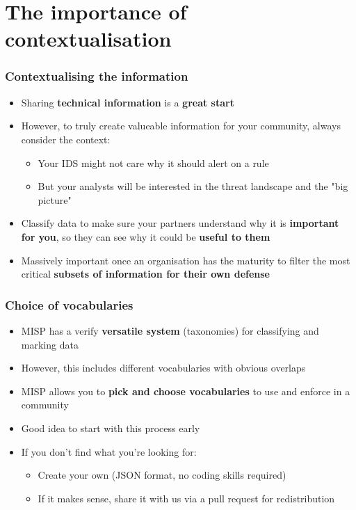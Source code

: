 \section{The importance of \\ contextualisation}

\begin{frame}
\frametitle{Contextualising the information}
\begin{itemize}
    \item Sharing {\bf technical information} is a {\bf great start}
	\item However, to truly create valueable information for your community, always consider the context:
	\begin{itemize}
		\item Your IDS might not care why it should alert on a rule
		\item But your analysts will be interested in the threat landscape and the "big picture"
	\end{itemize}
    \item Classify data to make sure your partners understand why it is {\bf important for you}, so they can see why it could be {\bf useful to them}
    \item Massively important once an organisation has the maturity to filter the most critical {\bf subsets of information for their own defense}
\end{itemize}
\end{frame}

\begin{frame}
\frametitle{Choice of vocabularies}
\begin{itemize}
    \item MISP has a verify {\bf versatile system} (taxonomies) for classifying and marking data
	\item However, this includes different vocabularies with obvious overlaps
    \item MISP allows you to {\bf pick and choose vocabularies} to use and enforce in a community
	\item Good idea to start with this process early
	\item If you don't find what you're looking for:
	\begin{itemize}
		\item Create your own (JSON format, no coding skills required)
		\item If it makes sense, share it with us via a pull request for redistribution
	\end{itemize}
\end{itemize}
\end{frame}


